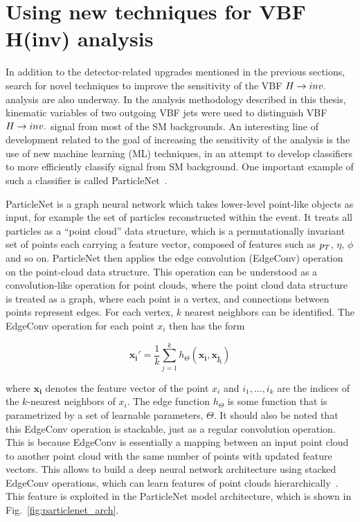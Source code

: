 \section{Using new techniques for VBF H(inv) analysis}

\graphicspath{{5_Outlook/Figures}}

In addition to the detector-related upgrades mentioned in the previous sections, search for novel techniques
to improve the sensitivity of the VBF $H \rightarrow inv.$ analysis are also underway. In the analysis methodology described
in this thesis, kinematic variables of two outgoing VBF jets were used to distinguish VBF $H \rightarrow inv.$ signal from
most of the SM backgrounds. An interesting line of development related to the goal of increasing the sensitivity 
of the analysis is the use of new machine learning (ML) techniques, in an attempt to develop classifiers to
more efficiently classify signal from SM background. One important example of such a classifier is called
ParticleNet~\cite{CMS:ParticleNetPaper}. 

ParticleNet is a graph neural network which takes lower-level point-like
objects as input, for example the set of particles reconstructed within the event. It treats all particles
as a ``point cloud'' data structure, which is a permutationally invariant set of points each carrying a feature
vector, composed of features such as $p_T$, $\eta$, $\phi$ and so on. ParticleNet then applies the edge convolution
(EdgeConv) operation~\cite{Wang:DynamicGraphCNNPaper} on the point-cloud data structure. This operation can be
understood as a convolution-like operation for point clouds, where the point cloud data structure is treated as
a graph, where each point is a vertex, and connections between points represent edges. For each vertex, $k$
nearest neighbors can be identified. The EdgeConv operation for each point $x_{i}$ then has the form

\begin{equation}
    \mathbf{x_i'} = \frac{1}{k} \sum_{j=1}^{k} h_{\Theta}(\mathbf{x_i}, \mathbf{x_{j_i}})
\end{equation}

where $\mathbf{x_i}$ denotes the feature vector of the point $x_i$ and ${i_1,...,i_k}$ are the indices of the 
$k$-nearest neighbors of $x_i$. The edge function $h_{\Theta}$ is some function that is parametrized by
a set of learnable parameters, $\Theta$. It should also be noted that this EdgeConv operation is stackable,
just as a regular convolution operation. This is because EdgeConv is essentially a mapping between an input
point cloud to another point cloud with the same number of points with updated feature vectors. 
This allows to build a deep neural network architecture 
using stacked EdgeConv operations, which can learn features of point clouds 
hierarchically~\cite{CMS:ParticleNetPaper}. 
This feature is exploited in the ParticleNet model architecture, which is shown in Fig.~\ref{fig:particlenet_arch}.

